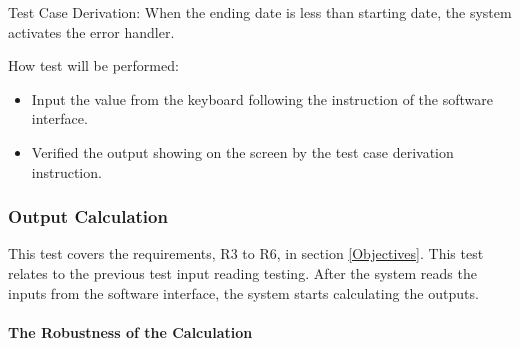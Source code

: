 \documentclass[12pt, titlepage]{article}
\begin{document}
\begin{enumerate}

Test Case Derivation: When the ending date is less than starting date, the system
activates the error handler. \\ 


How test will be performed: 

\begin{itemize} 
\item Input the value from the keyboard following the instruction of the
software interface. 
\item Verified the output showing on the screen by the test case derivation
instruction.
\end{itemize} 
\end{enumerate}

\subsubsection{Output Calculation}

This test covers the requirements, R3 to R6, in section \ref{Objectives}.
This test relates to the previous test input reading testing. After the 
system reads the inputs from the software interface, the system starts
calculating the outputs.



\paragraph{The Robustness of the Calculation}
\end{document}
